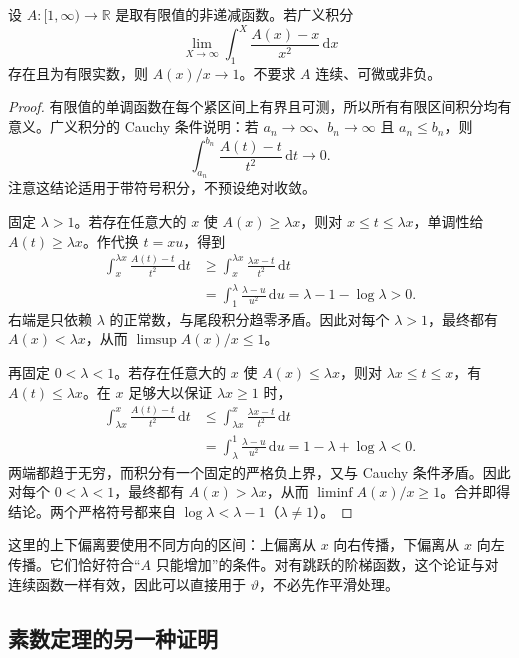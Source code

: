 \begin{lemma}[由积分收敛恢复单调函数的渐近]\label{b3:lem:27-monotone-integral}
设 \(A:[1,\infty)\to\mathbb R\) 是取有限值的非递减函数。若广义积分
\[
 \lim_{X\to\infty}\int_1^X\frac{A(x)-x}{x^2}\,\mathrm dx
\]
存在且为有限实数，则 \(A(x)/x\to1\)。不要求 \(A\) 连续、可微或非负。
\end{lemma}
\begin{proof}
有限值的单调函数在每个紧区间上有界且可测，所以所有有限区间积分均有意义。广义积分的 Cauchy 条件说明：若 \(a_n\to\infty\)、\(b_n\to\infty\) 且 \(a_n\le b_n\)，则
\[
 \int_{a_n}^{b_n}\frac{A(t)-t}{t^2}\,\mathrm dt\longrightarrow0.
\]
注意这结论适用于带符号积分，不预设绝对收敛。

固定 \(\lambda>1\)。若存在任意大的 \(x\) 使 \(A(x)\ge\lambda x\)，则对 \(x\le t\le\lambda x\)，单调性给 \(A(t)\ge\lambda x\)。作代换 \(t=xu\)，得到
\[
 \begin{aligned}
 \int_x^{\lambda x}\frac{A(t)-t}{t^2}\,\mathrm dt
 &\ge\int_x^{\lambda x}\frac{\lambda x-t}{t^2}\,\mathrm dt\\
 &=\int_1^\lambda\frac{\lambda-u}{u^2}\,\mathrm du
   =\lambda-1-\log\lambda>0.
 \end{aligned}
\]
右端是只依赖 \(\lambda\) 的正常数，与尾段积分趋零矛盾。因此对每个 \(\lambda>1\)，最终都有 \(A(x)<\lambda x\)，从而 \(\limsup A(x)/x\le1\)。

再固定 \(0<\lambda<1\)。若存在任意大的 \(x\) 使 \(A(x)\le\lambda x\)，则对 \(\lambda x\le t\le x\)，有 \(A(t)\le\lambda x\)。在 \(x\) 足够大以保证 \(\lambda x\ge1\) 时，
\[
 \begin{aligned}
 \int_{\lambda x}^x\frac{A(t)-t}{t^2}\,\mathrm dt
 &\le\int_{\lambda x}^x\frac{\lambda x-t}{t^2}\,\mathrm dt\\
 &=\int_\lambda^1\frac{\lambda-u}{u^2}\,\mathrm du
   =1-\lambda+\log\lambda<0.
 \end{aligned}
\]
两端都趋于无穷，而积分有一个固定的严格负上界，又与 Cauchy 条件矛盾。因此对每个 \(0<\lambda<1\)，最终都有 \(A(x)>\lambda x\)，从而 \(\liminf A(x)/x\ge1\)。合并即得结论。两个严格符号都来自 \(\log\lambda<\lambda-1\)（\(\lambda\ne1\)）。
\end{proof}

这里的上下偏离要使用不同方向的区间：上偏离从 \(x\) 向右传播，下偏离从 \(x\) 向左传播。它们恰好符合“\(A\) 只能增加”的条件。对有跳跃的阶梯函数，这个论证与对连续函数一样有效，因此可以直接用于 \(\vartheta\)，不必先作平滑处理。

\subsection{素数定理的另一种证明}
\label{b3:subsec:270604}

